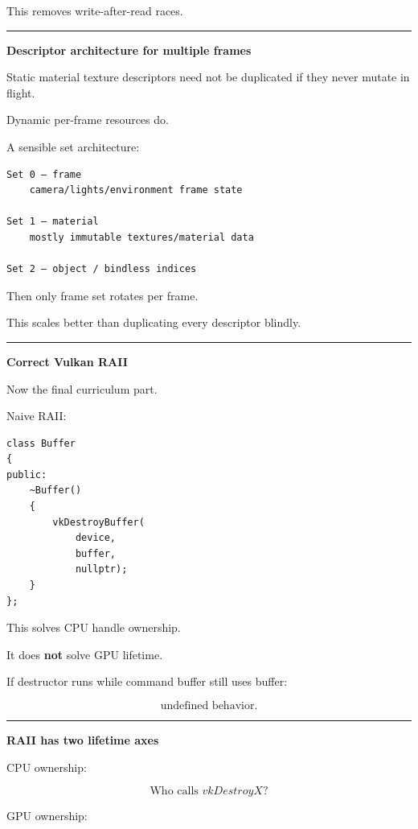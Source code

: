 This removes write-after-read races.

\begin{center}\rule{0.5\linewidth}{0.5pt}\end{center}

\textbf{Descriptor architecture for multiple frames}

Static material texture descriptors need not be duplicated if they never mutate in flight.

Dynamic per-frame resources do.

A sensible set architecture:

\begin{verbatim}
Set 0 — frame
    camera/lights/environment frame state

Set 1 — material
    mostly immutable textures/material data

Set 2 — object / bindless indices
\end{verbatim}

Then only frame set rotates per frame.

This scales better than duplicating every descriptor blindly.

\begin{center}\rule{0.5\linewidth}{0.5pt}\end{center}

\textbf{Correct Vulkan RAII}

Now the final curriculum part.

Naive RAII:

\begin{verbatim}
class Buffer
{
public:
    ~Buffer()
    {
        vkDestroyBuffer(
            device,
            buffer,
            nullptr);
    }
};
\end{verbatim}

This solves CPU handle ownership.

It does \textbf{not} solve GPU lifetime.

If destructor runs while command buffer still uses buffer:

\[
\boxed{\text{undefined behavior}.}
\]

\begin{center}\rule{0.5\linewidth}{0.5pt}\end{center}

\textbf{RAII has two lifetime axes}

CPU ownership:

\[
\boxed{
\text{Who calls }vkDestroyX?
}
\]

GPU ownership:

